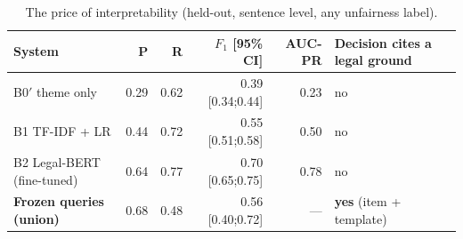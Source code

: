 \begin{table}[t]
\caption{The price of interpretability (held-out, sentence level, any unfairness label).}
\label{tab:cost}
\centering
\footnotesize\setlength{\tabcolsep}{4pt}
\begin{tabular}{@{}lrrrrl@{}}
\toprule
System & P & R & $F_1$ [95\% CI] & AUC-PR & Decision cites a legal ground \\
\midrule
B0$'$ theme only & 0.29 & 0.62 & 0.39 [0.34;0.44] & 0.23 & no \\
B1 TF-IDF + LR & 0.44 & 0.72 & 0.55 [0.51;0.58] & 0.50 & no \\
B2 Legal-BERT (fine-tuned) & 0.64 & 0.77 & 0.70 [0.65;0.75] & 0.78 & no \\
\textbf{Frozen queries (union)} & 0.68 & 0.48 & 0.56 [0.40;0.72] & --- & \textbf{yes} (item + template) \\
\bottomrule
\end{tabular}
\end{table}

